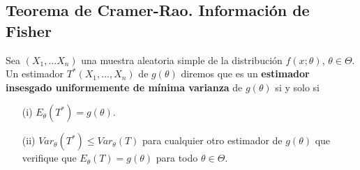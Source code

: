 \subsection{Teorema de Cramer-Rao. Información de Fisher}

\begin{defi}
    Sea $(X_1,...X_n)$ una muestra aleatoria simple de la distribución $f(x;\theta)$, $\theta \in \Theta$. Un estimador $T^*(X_1,...,X_n)$ de $g(\theta)$ diremos que es un \textbf{estimador insesgado uniformemente de mínima varianza} de $g(\theta)$ si y solo si
    \begin{enumerate}
        \item[(i)] $E_{\theta}(T^*) = g(\theta)$.
        \item[(ii)] $Var_{\theta}(T^*) \leq Var_{\theta}(T)$ para cualquier otro estimador de $g(\theta)$ que verifique que $E_{\theta}(T) = g(\theta)$ para todo $\theta \in \Theta$.
    \end{enumerate}
\end{defi}

